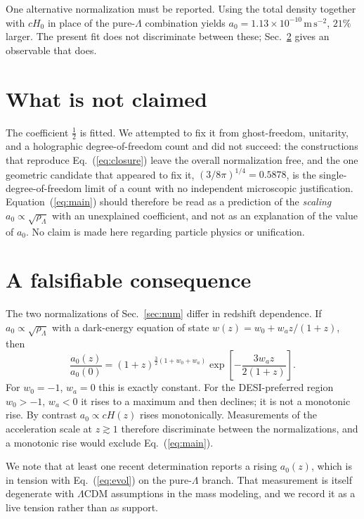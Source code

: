 \documentclass[11pt]{article}
\begin{document}
One alternative normalization must be reported. Using the total density together with $cH_0$ in place of
the pure-$\Lambda$ combination yields $a_0 = 1.13\times10^{-10}\,\mathrm{m\,s^{-2}}$, $21\%$ larger.
The present fit does not discriminate between these; Sec.~\ref{sec:test} gives an observable that does.

\section{What is not claimed}

The coefficient $\tfrac12$ is fitted. We attempted to fix it from ghost-freedom, unitarity, and a
holographic degree-of-freedom count and did not succeed: the constructions that reproduce
Eq.~(\ref{eq:closure}) leave the overall normalization free, and the one geometric candidate that
appeared to fix it, $(3/8\pi)^{1/4} = 0.5878$, is the single-degree-of-freedom limit of a count with no
independent microscopic justification. Equation~(\ref{eq:main}) should therefore be read as a
prediction of the \emph{scaling} $a_0\propto\sqrt{\rho_\Lambda}$ with an unexplained coefficient, and
not as an explanation of the value of $a_0$. No claim is made here regarding particle physics or
unification.

\section{A falsifiable consequence}
\label{sec:test}

The two normalizations of Sec.~\ref{sec:num} differ in redshift dependence. If
$a_0\propto\sqrt{\rho_\Lambda}$ with a dark-energy equation of state
$w(z) = w_0 + w_a z/(1+z)$, then
\begin{equation}
\frac{a_0(z)}{a_0(0)} = (1+z)^{\frac32(1+w_0+w_a)}\exp\!\left[-\frac{3w_a z}{2(1+z)}\right].
\label{eq:evol}
\end{equation}
For $w_0=-1$, $w_a=0$ this is exactly constant. For the DESI-preferred region $w_0>-1$, $w_a<0$ it
rises to a maximum and then declines; it is not a monotonic rise. By contrast $a_0\propto cH(z)$ rises
monotonically. Measurements of the acceleration scale at $z\gtrsim1$ therefore discriminate between the
normalizations, and a monotonic rise would exclude Eq.~(\ref{eq:main}).

We note that at least one recent determination reports a rising $a_0(z)$, which is in tension with
Eq.~(\ref{eq:evol}) on the pure-$\Lambda$ branch. That measurement is itself degenerate with
$\Lambda$CDM assumptions in the mass modeling, and we record it as a live tension rather than as
support.
\end{document}
